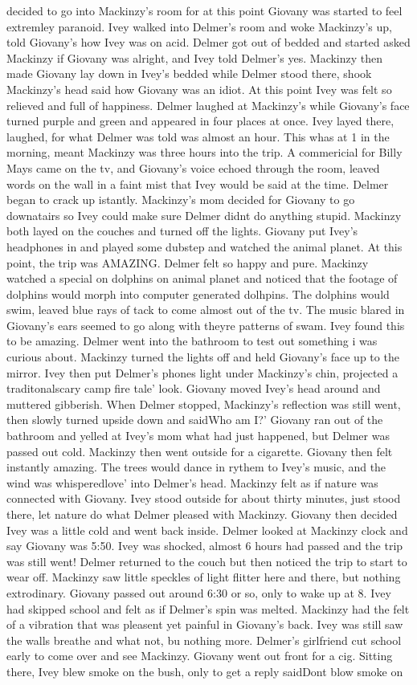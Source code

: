 \documentclass[12pt]{book}
\begin{document}
decided to go into Mackinzy's room for at this point Giovany was started to feel extremley paranoid. Ivey walked into Delmer's room and woke Mackinzy's up, told Giovany's how Ivey was on acid. Delmer got out of bedded and started asked Mackinzy if Giovany was alright, and Ivey told Delmer's yes. Mackinzy then made Giovany lay down in Ivey's bedded while Delmer stood there, shook Mackinzy's head said how Giovany was an idiot. At this point Ivey was felt so relieved and full of happiness. Delmer laughed at Mackinzy's while Giovany's face turned purple and green and appeared in four places at once. Ivey layed there, laughed, for what Delmer was told was almost an hour. This whas at 1 in the morning, meant Mackinzy was three hours into the trip. A commericial for Billy Mays came on the tv, and Giovany's voice echoed through the room, leaved words on the wall in a faint mist that Ivey would be said at the time. Delmer began to crack up istantly. Mackinzy's mom decided for Giovany to go downatairs so Ivey could make sure Delmer didnt do anything stupid. Mackinzy both layed on the couches and turned off the lights. Giovany put Ivey's headphones in and played some dubstep and watched the animal planet. At this point, the trip was AMAZING. Delmer felt so happy and pure. Mackinzy watched a special on dolphins on animal planet and noticed that the footage of dolphins would morph into computer generated dolhpins. The dolphins would swim, leaved blue rays of tack to come almost out of the tv. The music blared in Giovany's ears seemed to go along with theyre patterns of swam. Ivey found this to be amazing. Delmer went into the bathroom to test out something i was curious about. Mackinzy turned the lights off and held Giovany's face up to the mirror. Ivey then put Delmer's phones light under Mackinzy's chin, projected a traditonalscary camp fire tale' look. Giovany moved Ivey's head around and muttered gibberish. When Delmer stopped, Mackinzy's reflection was still went, then slowly turned upside down and saidWho am I?' Giovany ran out of the bathroom and yelled at Ivey's mom what had just happened, but Delmer was passed out cold. Mackinzy then went outside for a cigarette. Giovany then felt instantly amazing. The trees would dance in rythem to Ivey's music, and the wind was whisperedlove' into Delmer's head. Mackinzy felt as if nature was connected with Giovany. Ivey stood outside for about thirty minutes, just stood there, let nature do what Delmer pleased with Mackinzy. Giovany then decided Ivey was a little cold and went back inside. Delmer looked at Mackinzy clock and say Giovany was 5:50. Ivey was shocked, almost 6 hours had passed and the trip was still went! Delmer returned to the couch but then noticed the trip to start to wear off. Mackinzy saw little speckles of light flitter here and there, but nothing extrodinary. Giovany passed out around 6:30 or so, only to wake up at 8. Ivey had skipped school and felt as if Delmer's spin was melted. Mackinzy had the felt of a vibration that was pleasent yet painful in Giovany's back. Ivey was still saw the walls breathe and what not, bu nothing more. Delmer's girlfriend cut school early to come over and see Mackinzy. Giovany went out front for a cig. Sitting there, Ivey blew smoke on the bush, only to get a reply saidDont blow smoke on 
\end{document}
